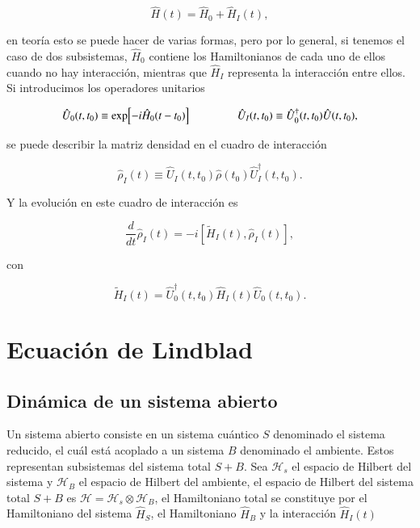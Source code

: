 \begin{equation*}
    \hat{H}(t) = \hat{H}_{0} + \hat{H}_{I}(t),
\end{equation*}

en teoría esto se puede hacer de varias formas, pero por lo general, si tenemos el caso de dos subsistemas, $\hat{H}_{0}$ contiene los Hamiltonianos de cada uno de ellos cuando no hay interacción, mientras que $\hat{H}_{I}$ representa la interacción entre ellos. Si introducimos los operadores unitarios

\begin{equation*}
    \hat{U}_{0}(t,t_{0}) \equiv \exp[-i\hat{H}_{0}(t-t_{0}) ]  \hspace{15mm} \hat{U}_{I}(t,t_0) \equiv \hat{U}^{\dagger}_{0}(t,t_{0})\hat{U}(t,t_{0}),
\end{equation*}

se puede describir la matriz densidad en el cuadro de interacción

\begin{equation*}
    \hat{\rho}_{I}(t) \equiv \hat{U}_{I}(t,t_{0})\hat{\rho}(t_{0})\hat{U}^{\dagger}_{I}(t,t_{0}).
\end{equation*}

Y la evolución en este cuadro de interacción es 

\begin{equation}
    \frac{d}{dt}\hat{\rho}_{I}(t) = -i[\tilde{H}_{I}(t), \hat{\rho}_{I}(t)],
    \label{sec11:interactionp}
\end{equation}

con 

\begin{equation*}
    \tilde{H}_{I}(t) = \hat{U}^{\dagger}_{0}(t,t_{0})\hat{H}_{I}(t)\hat{U}_{0}(t,t_{0}).
\end{equation*}

\label{sec:closedQM}



\section{Ecuación de Lindblad}

\subsection{Dinámica de un sistema abierto}

Un sistema abierto consiste en un sistema cuántico $S$ denominado el sistema reducido, el cuál está acoplado a un sistema $B$ denominado el ambiente. Estos representan  subsistemas del sistema total $S+B$. Sea $\mathcal{H}_{s}$ el espacio de Hilbert del sistema y $\mathcal{H}_{B}$ el espacio de Hilbert del ambiente, el espacio de Hilbert del sistema total $S+B$ es  $\mathcal{H} = \mathcal{H}_{s} \otimes \mathcal{H}_{B}$, el Hamiltoniano total se constituye por el Hamiltoniano del sistema $\hat{H}_{S}$, el Hamiltoniano $\hat{H}_{B}$ y la interacción $\hat{H}_{I}(t)$


